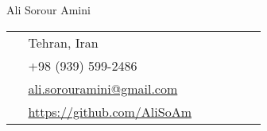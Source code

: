 \begin{paracol}{2}
  \parbox[top][0.12\textheight][c]{\linewidth}
  {
    \vspace{-0.04\textheight}
    \centering
    {\sffamily\Huge Ali Sorour Amini}
  }
  \switchcolumn
  \parbox[top][0.12\textheight][c]{\linewidth}
  {
    \vspace{-0.04\textheight}
    \colorbox{shade}
    {
      \begin{supertabular}{p{0.05\linewidth}|p{0.775\linewidth}}
        \raisebox{-1pt}{\faHome} & Tehran, Iran\\
        \raisebox{-1pt}{\faPhone} & +98 (939) 599-2486 \\
        \raisebox{0pt}{\small\faEnvelope} & \href{mailto:ali.sorouramini@gmail.com}{ali.sorouramini@gmail.com} \\
        \raisebox{-1pt}{\faGithub} & \href{https://github.com/AliSoAm}{https://github.com/AliSoAm} \\
      \end{supertabular}
    }
  }
\end{paracol}

